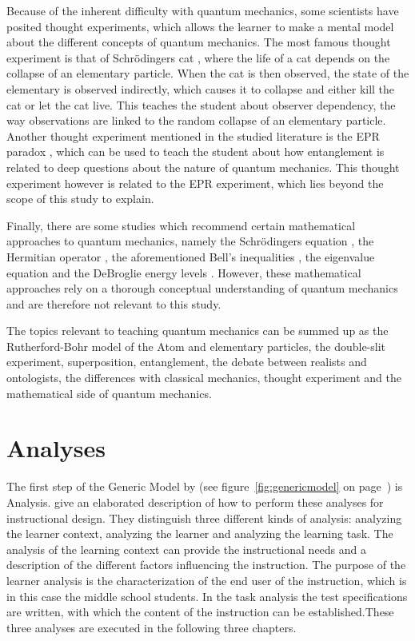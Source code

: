 \documentclass[11pt,twoside]{report} %
\begin{document}
Because of the inherent difficulty with quantum mechanics, some scientists have posited thought experiments, which allows the learner to make a mental model about the different concepts of quantum mechanics. The most famous thought experiment is that of Schrödingers cat \cite{muller, velentzas}, where the life of a cat depends on the collapse of an elementary particle. When the cat is then observed, the state of the elementary is observed indirectly, which causes it to collapse and either kill the cat or let the cat live. This teaches the student about observer dependency, the way observations are linked to the random collapse of an elementary particle. Another thought experiment mentioned in the studied literature is the EPR paradox \cite{kuttner, muller, velentzas}, which can be used to teach the student about how entanglement is related to deep questions about the nature of quantum mechanics. This thought experiment however is related to the EPR experiment, which lies beyond the scope of this study to explain.

Finally, there are some studies which recommend certain mathematical approaches to quantum mechanics, namely the Schrödingers equation \cite{muller, singh2}, the Hermitian operator \cite{singh2}, the aforementioned Bell's inequalities \cite{kuttner, muller}, the eigenvalue equation \cite{muller} and the DeBroglie energy levels \cite{dori, gianino, mckagan}. However, these mathematical approaches rely on a thorough conceptual understanding of quantum mechanics and are therefore not relevant to this study.

The topics relevant to teaching quantum mechanics can be summed up as the Rutherford-Bohr model of the Atom and elementary particles, the double-slit experiment, superposition, entanglement, the debate between realists and ontologists, the differences with classical mechanics, thought experiment and the mathematical side of quantum mechanics.

\chapter{Analyses}
\thispagestyle{fancy}

The first step of the Generic Model by  (see figure~\ref{fig:genericmodel} on page~\pageref{fig:genericmodel}) is Analysis.  give an elaborated description of how to perform these analyses for instructional design. They distinguish three different kinds of analysis: analyzing the learner context, analyzing the learner and analyzing the learning task. The analysis of the learning context can provide the instructional needs and a description of the different factors influencing the instruction. The purpose of the learner analysis is the characterization of the end user of the instruction, which is in this case the middle school students. In the task analysis the test specifications are written, with which the content of the instruction can be established.These three analyses are executed in the following three chapters.
\end{document}
